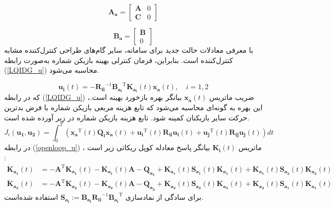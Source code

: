  \begin{equation}
	\boldsymbol{A_a} = \begin{bmatrix}
		\boldsymbol{A} &0\\
		\boldsymbol{C} & 0
	\end{bmatrix}
\end{equation}

\begin{equation}
	\boldsymbol{B_a} = \begin{bmatrix}
		\boldsymbol{B}\\
		0
	\end{bmatrix}
\end{equation}
با معرفی معادلات حالت جدید برای سامانه، سایر گام‌های طراحی کنترل‌کننده
 مشابه کنترل‌کننده
است. بنابراین، فرمان کنترلی بهینه  بازیکن شماره  به‌صورت رابطه
(\ref{LQIDG_u})
محاسبه می‌شود.

\begin{equation}\label{LQIDG_u}
	\boldsymbol{u_i}(t) = -\boldsymbol{R_{ii}}^{-1}\boldsymbol{B_{a_i}}^\mathrm{T}\boldsymbol{K_{a_i}}(t)\boldsymbol{x_a}(t),\quad i = 1, 2
\end{equation}
که در رابطه 
(\ref{LQIDG_u})
،ضریب ماتریس $\boldsymbol{x_a}(t)$ بیانگر بهره بازخورد بهینه است. این بهره به گونه‌ای محاسبه می‌شود که تابع هزینه مربعی بازیکن شماره  با فرض بدترین حرکت سایر بازیکنان کمینه شود. تابع هزینه بازیکن شماره  در زیر آورده شده است.
\begin{equation}
	J_i( \boldsymbol{u_1},  \boldsymbol{u_2}) = \int_{0}^{T}\left( \boldsymbol{x_a} ^\mathrm{T}(t) \boldsymbol{Q_i} \boldsymbol{x_a}(t)+
	\boldsymbol{u_i} ^\mathrm{T}(t) \boldsymbol{R_{ii}} \boldsymbol{u_i}(t)+
	\boldsymbol{u_j} ^\mathrm{T}(t)\boldsymbol{ R_{ij} u_j}(t)
	\right)dt
\end{equation}
در رابطه 
(\ref{openloop_u})
، ماتریس $\boldsymbol{K_{i}}(t)$ بیانگر پاسخ معادله کوپل ریكاتی
زیر است
\cite{diff_game}:
\begin{equation}\label{coupled_riccatti_LQIDG}
	\begin{split}
		\boldsymbol{\dot{K}_{a_1}}(t) &= -\boldsymbol{A}^\mathrm{T}\boldsymbol{K_{a_1}}(t) - \boldsymbol{K_{a_1}}(t)\boldsymbol{A} - \boldsymbol{Q_{a_1}} +\boldsymbol{K_{a_1}}(t)\boldsymbol{S_{a_1}}(t)\boldsymbol{K_{a_1}}(t) + \boldsymbol{K_{a_1}}(t)\boldsymbol{S_{a_2}}(t)\boldsymbol{K_{a_2}}(t)\\
		\boldsymbol{\dot{K}_{a_2}}(t) &= -\boldsymbol{A}^\mathrm{T}\boldsymbol{K_{a_2}}(t) - \boldsymbol{K_{a_2}}(t)\boldsymbol{A} - \boldsymbol{Q_{a_2}} +\boldsymbol{K_{a_2}}(t)\boldsymbol{S_{a_2}}(t)\boldsymbol{K_{a_2}}(t) + \boldsymbol{K_{a_2}}(t)\boldsymbol{S_{a_1}}(t)\boldsymbol{K_{a_1}}(t)
	\end{split}
\end{equation}
برای سادگی از نمادسازی
$\boldsymbol{S_{a_i}} := \boldsymbol{B_{a_i}R_{ii}}^{-1}\boldsymbol{B_{a_i}}^\mathrm{T}$
استفاده شده‌است. 
 
 
 
 
